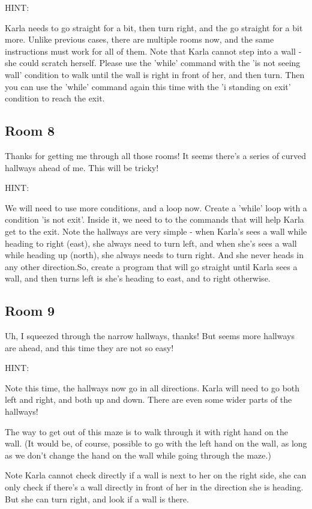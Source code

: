 HINT:

Karla needs to go straight for a bit, then turn right, and the go straight for a bit more. Unlike previous cases, there are multiple rooms now, and the same instructions must work for all of them. Note that Karla cannot step into a wall - she could scratch herself. Please use the 'while' command with the 'is not seeing wall' condition to walk until the wall is right in front of her, and then turn. Then you can use the 'while' command again this time with the 'i standing on exit' condition to reach the exit.

\subsection{Room 8}

Thanks for getting me through all those rooms! It seems there's a series of curved hallways ahead of me. This will be tricky!

HINT:

We will need to use more conditions, and a loop now. Create a 'while' loop with a condition 'is not exit'. Inside it, we need to to the commands that will help Karla get to the exit. Note the hallways are very simple - when Karla's sees a wall while heading to right (east), she always need to turn left, and when she's sees a wall while heading up (north), she always needs to turn right. And she never heads in any other direction.So, create a program that will go straight until Karla sees a wall, and then turns left is she's heading to east, and to right otherwise.

\subsection{Room 9}

Uh, I squeezed through the narrow hallways, thanks! But seems more hallways are ahead, and this time they are not so easy!

HINT:

Note this time, the hallways now go in all directions. Karla will need to go both left and right, and both up and down. There are even some wider parts of the hallways!

The way to get out of this maze is to walk through it with right hand on the wall. (It would be, of course, possible to go with the left hand on the wall, as long as we don't change the hand on the wall while going through the maze.)

Note Karla cannot check directly if a wall is next to her on the right side, she can only check if there's a wall directly in front of her in the direction she is heading. But she can turn right, and look if a wall is there.

